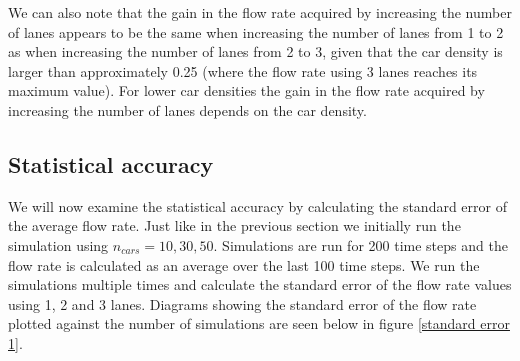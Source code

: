 \documentclass[a4paper,12pt]{article}
\begin{document}
We can also note that the gain in the flow rate acquired by increasing the number of lanes appears to be the same when increasing the number of lanes from 1 to 2 as when
increasing the number of lanes from 2 to 3, given that the car density is larger than approximately 0.25 (where the flow rate using 3 lanes reaches its maximum value).
For lower car densities the gain in the flow rate acquired by increasing the number of lanes depends on the car density.

\subsection*{Statistical accuracy}
We will now examine the statistical accuracy by calculating the standard error of the average flow rate. Just like in the previous section we initially run the simulation
using $n_{cars}=10, 30, 50$. Simulations are run for 200 time steps and the flow rate is calculated as an average over the last 100 time steps.
We run the simulations multiple times and calculate the standard error of the flow rate values using 1, 2 and 3 lanes. Diagrams showing the
standard error of the flow rate plotted against the number of simulations are seen below in figure \ref*{standard error 1}.
\end{document}
